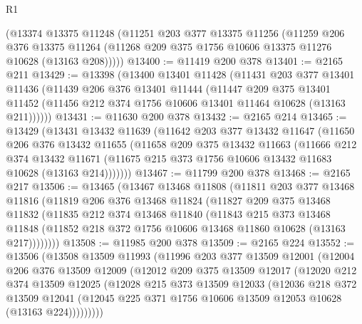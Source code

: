 \begin{lexlean}{R1}
\begin{coremodule}
    (@13374
      @13375
      @11248
      (@11251
        @203
        @377
        @13375
        @11256
        (@11259
          @206
          @376
          @13375
          @11264
          (@11268 @209 @375 @1756 @10606 @13375 @11276 @10628 (@13163 @208)))))
@13400 := @11419 @200 @378
@13401 := @2165 @211
@13429 := @13398
    (@13400
      @13401
      @11428
      (@11431
        @203
        @377
        @13401
        @11436
        (@11439
          @206
          @376
          @13401
          @11444
          (@11447
            @209
            @375
            @13401
            @11452
            (@11456 @212 @374 @1756 @10606 @13401 @11464 @10628 (@13163 @211))))))
@13431 := @11630 @200 @378
@13432 := @2165 @214
@13465 := @13429
    (@13431
      @13432
      @11639
      (@11642
        @203
        @377
        @13432
        @11647
        (@11650
          @206
          @376
          @13432
          @11655
          (@11658
            @209
            @375
            @13432
            @11663
            (@11666
              @212
              @374
              @13432
              @11671
              (@11675 @215 @373 @1756 @10606 @13432 @11683 @10628 (@13163 @214)))))))
@13467 := @11799 @200 @378
@13468 := @2165 @217
@13506 := @13465
    (@13467
      @13468
      @11808
      (@11811
        @203
        @377
        @13468
        @11816
        (@11819
          @206
          @376
          @13468
          @11824
          (@11827
            @209
            @375
            @13468
            @11832
            (@11835
              @212
              @374
              @13468
              @11840
              (@11843
                @215
                @373
                @13468
                @11848
                (@11852 @218 @372 @1756 @10606 @13468 @11860 @10628 (@13163 @217))))))))
@13508 := @11985 @200 @378
@13509 := @2165 @224
@13552 := @13506
    (@13508
      @13509
      @11993
      (@11996
        @203
        @377
        @13509
        @12001
        (@12004
          @206
          @376
          @13509
          @12009
          (@12012
            @209
            @375
            @13509
            @12017
            (@12020
              @212
              @374
              @13509
              @12025
              (@12028
                @215
                @373
                @13509
                @12033
                (@12036
                  @218
                  @372
                  @13509
                  @12041
                  (@12045 @225 @371 @1756 @10606 @13509 @12053 @10628 (@13163 @224)))))))))

\end{coremodule}
\end{lexlean}
